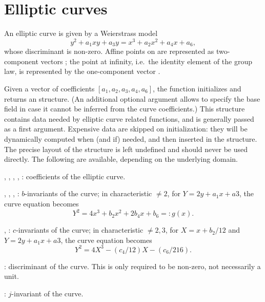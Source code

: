 \bigskip


\section{Elliptic curves}

An elliptic curve is given by a Weierstrass model
$$
  y^2+a_1xy+a_3y=x^3+a_2x^2+a_4x+a_6,
$$
whose discriminant is non-zero. Affine points on  are represented as
two-component vectors \kbd{[x,y]}; the point at infinity, i.e.~the identity
element of the group law, is represented by the one-component vector
\kbd{[0]}.

Given a vector of coefficients $[a_1,a_2,a_3,a_4,a_6]$, the function
 initializes and returns an  structure. (An additional
optional argument allows to specify the base field in case it cannot be
inferred from the curve coefficients.) This structure contains data needed by
elliptic curve related functions, and is generally passed as a first argument.
Expensive data are skipped on initialization: they will be dynamically
computed when (and if) needed, and then inserted in the structure. The
precise layout of the  structure is left undefined and should never
be used directly. The following  are available,
depending on the underlying domain.


\item {}, , , , : coefficients of the
elliptic curve.

\item {}, , , : $b$-invariants of the curve; in
characteristic $\neq 2$, for $Y = 2y + a_1x+a3$, the curve equation becomes
$$ Y^2 = 4 x^3 + b_2 x^2 + 2b_4 x + b_6 =: g(x). $$

\item {}, : $c$-invariants of the curve; in characteristic $\neq
2,3$, for $X = x + b_2/12$ and $Y = 2y + a_1x+a3$, the curve equation becomes
$$ Y^2 = 4 X^3 - (c_4/12) X - (c_6/216). $$

\item {}: discriminant of the curve. This is only required to be
non-zero, not necessarily a unit.

\item {}: $j$-invariant of the curve.


